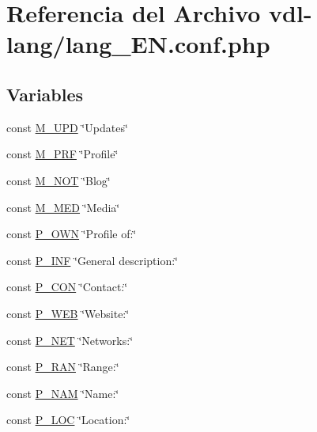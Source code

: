 \hypertarget{lang__EN_8conf_8php}{\section{Referencia del Archivo vdl-\/lang/lang\-\_\-\-E\-N.conf.\-php}
\label{lang__EN_8conf_8php}
}
\subsection*{Variables}
\begin{DoxyCompactItemize}
\item 
const \hyperlink{lang__EN_8conf_8php_aa05f4b68a1c61dd74d97c3a7c79f1efd}{M\-\_\-\-U\-P\-D} \char`\"{}Updates\char`\"{}
\item 
const \hyperlink{lang__EN_8conf_8php_acc375524bbf44b4d19de33e33c37b987}{M\-\_\-\-P\-R\-F} \char`\"{}Profile\char`\"{}
\item 
const \hyperlink{lang__EN_8conf_8php_a54125c8fde2d02736eb378419d0c5e07}{M\-\_\-\-N\-O\-T} \char`\"{}Blog\char`\"{}
\item 
const \hyperlink{lang__EN_8conf_8php_a8f62983a225a0e2c9e4c149d53adef1d}{M\-\_\-\-M\-E\-D} \char`\"{}Media\char`\"{}
\item 
const \hyperlink{lang__EN_8conf_8php_ac1d527ffba12018124c595f2ad74c851}{P\-\_\-\-O\-W\-N} \char`\"{}Profile of\-:\char`\"{}
\item 
const \hyperlink{lang__EN_8conf_8php_a31d1da665267d377fc62572b9b2e09fa}{P\-\_\-\-I\-N\-F} \char`\"{}General description\-:\char`\"{}
\item 
const \hyperlink{lang__EN_8conf_8php_ad3f5472a251165b7eb05aa8e4084a10c}{P\-\_\-\-C\-O\-N} \char`\"{}Contact\-:\char`\"{}
\item 
const \hyperlink{lang__EN_8conf_8php_ade9836b8897b65809f548b7781e977e2}{P\-\_\-\-W\-E\-B} \char`\"{}Website\-:\char`\"{}
\item 
const \hyperlink{lang__EN_8conf_8php_a7b08d18ad2a5adbaae77bea17fd408bf}{P\-\_\-\-N\-E\-T} \char`\"{}Networks\-:\char`\"{}
\item 
const \hyperlink{lang__EN_8conf_8php_a5fca0022c5481060364d39a3812ac604}{P\-\_\-\-R\-A\-N} \char`\"{}Range\-:\char`\"{}
\item 
const \hyperlink{lang__EN_8conf_8php_a298d6af9ed729c17543a14644e5be675}{P\-\_\-\-N\-A\-M} \char`\"{}Name\-:\char`\"{}
\item 
const \hyperlink{lang__EN_8conf_8php_ac5de6ba666c926e6b375d153846010c3}{P\-\_\-\-L\-O\-C} \char`\"{}Location\-:\char`\"{}

\end{DoxyCompactItemize}
